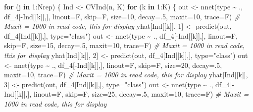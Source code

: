 \documentclass[
]{article}
\newenvironment{Shaded}{\begin{snugshade}}{\end{snugshade}}
\newcommand{\AttributeTok}[1]{\textcolor[rgb]{0.77,0.63,0.00}{#1}}
\newcommand{\CommentTok}[1]{\textcolor[rgb]{0.56,0.35,0.01}{\textit{#1}}}
\newcommand{\ControlFlowTok}[1]{\textcolor[rgb]{0.13,0.29,0.53}{\textbf{#1}}}
\newcommand{\DecValTok}[1]{\textcolor[rgb]{0.00,0.00,0.81}{#1}}
\newcommand{\FunctionTok}[1]{\textcolor[rgb]{0.00,0.00,0.00}{#1}}
\newcommand{\NormalTok}[1]{#1}
\newcommand{\OtherTok}[1]{\textcolor[rgb]{0.56,0.35,0.01}{#1}}
\newcommand{\SpecialCharTok}[1]{\textcolor[rgb]{0.00,0.00,0.00}{#1}}
\newcommand{\StringTok}[1]{\textcolor[rgb]{0.31,0.60,0.02}{#1}}
\begin{document}
\begin{Shaded}
\begin{Highlighting}[]
\ControlFlowTok{for}\NormalTok{ (j }\ControlFlowTok{in} \DecValTok{1}\SpecialCharTok{:}\NormalTok{Nrep) \{}
\NormalTok{  Ind }\OtherTok{\textless{}{-}} \FunctionTok{CVInd}\NormalTok{(n, K)}
  \ControlFlowTok{for}\NormalTok{ (k }\ControlFlowTok{in} \DecValTok{1}\SpecialCharTok{:}\NormalTok{K) \{}
\NormalTok{    out }\OtherTok{\textless{}{-}} \FunctionTok{nnet}\NormalTok{(type }\SpecialCharTok{\textasciitilde{}}\NormalTok{ ., df\_4[}\SpecialCharTok{{-}}\NormalTok{Ind[[k]],], }\AttributeTok{linout=}\NormalTok{F, }\AttributeTok{skip=}\NormalTok{F, }\AttributeTok{size=}\DecValTok{10}\NormalTok{, }\AttributeTok{decay=}\NormalTok{.}\DecValTok{5}\NormalTok{, }\AttributeTok{maxit=}\DecValTok{10}\NormalTok{, }\AttributeTok{trace=}\NormalTok{F) }\CommentTok{\# Maxit = 1000 in read code, this for display}
\NormalTok{    yhat[Ind[[k]], }\DecValTok{1}\NormalTok{] }\OtherTok{\textless{}{-}} \FunctionTok{predict}\NormalTok{(out, df\_4[Ind[[k]],], }\AttributeTok{type=}\StringTok{"class"}\NormalTok{)}
\NormalTok{    out }\OtherTok{\textless{}{-}} \FunctionTok{nnet}\NormalTok{(type }\SpecialCharTok{\textasciitilde{}}\NormalTok{ ., df\_4[}\SpecialCharTok{{-}}\NormalTok{Ind[[k]],], }\AttributeTok{linout=}\NormalTok{F, }\AttributeTok{skip=}\NormalTok{F, }\AttributeTok{size=}\DecValTok{15}\NormalTok{, }\AttributeTok{decay=}\NormalTok{.}\DecValTok{5}\NormalTok{, }\AttributeTok{maxit=}\DecValTok{10}\NormalTok{, }\AttributeTok{trace=}\NormalTok{F) }\CommentTok{\# Maxit = 1000 in read code, this for display}
\NormalTok{    yhat[Ind[[k]], }\DecValTok{2}\NormalTok{] }\OtherTok{\textless{}{-}} \FunctionTok{predict}\NormalTok{(out, df\_4[Ind[[k]],], }\AttributeTok{type=}\StringTok{"class"}\NormalTok{)}
\NormalTok{    out }\OtherTok{\textless{}{-}} \FunctionTok{nnet}\NormalTok{(type }\SpecialCharTok{\textasciitilde{}}\NormalTok{ ., df\_4[}\SpecialCharTok{{-}}\NormalTok{Ind[[k]],], }\AttributeTok{linout=}\NormalTok{F, }\AttributeTok{skip=}\NormalTok{F, }\AttributeTok{size=}\DecValTok{20}\NormalTok{, }\AttributeTok{decay=}\NormalTok{.}\DecValTok{5}\NormalTok{, }\AttributeTok{maxit=}\DecValTok{10}\NormalTok{, }\AttributeTok{trace=}\NormalTok{F) }\CommentTok{\# Maxit = 1000 in read code, this for display}
\NormalTok{    yhat[Ind[[k]], }\DecValTok{3}\NormalTok{] }\OtherTok{\textless{}{-}} \FunctionTok{predict}\NormalTok{(out, df\_4[Ind[[k]],], }\AttributeTok{type=}\StringTok{"class"}\NormalTok{)}
\NormalTok{    out }\OtherTok{\textless{}{-}} \FunctionTok{nnet}\NormalTok{(type }\SpecialCharTok{\textasciitilde{}}\NormalTok{ ., df\_4[}\SpecialCharTok{{-}}\NormalTok{Ind[[k]],], }\AttributeTok{linout=}\NormalTok{F, }\AttributeTok{skip=}\NormalTok{F, }\AttributeTok{size=}\DecValTok{25}\NormalTok{, }\AttributeTok{decay=}\NormalTok{.}\DecValTok{5}\NormalTok{, }\AttributeTok{maxit=}\DecValTok{10}\NormalTok{, }\AttributeTok{trace=}\NormalTok{F) }\CommentTok{\# Maxit = 1000 in read code, this for display}

\end{Highlighting}
\end{Shaded}
\end{document}
